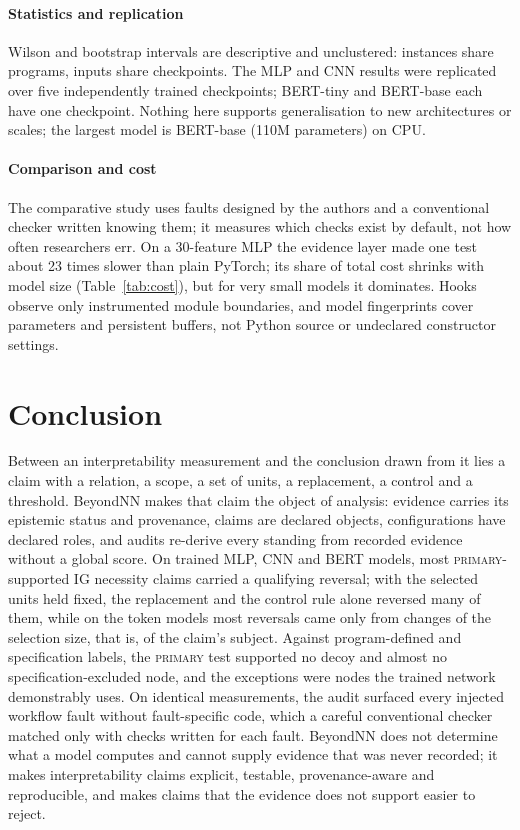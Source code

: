 \paragraph*{Statistics and replication}
Wilson and bootstrap intervals are descriptive and unclustered: instances share programs, inputs share checkpoints. The MLP and CNN results were replicated over five independently trained checkpoints; BERT-tiny and BERT-base each have one checkpoint. Nothing here supports generalisation to new architectures or scales; the largest model is BERT-base (110M parameters) on CPU.

\paragraph*{Comparison and cost}
The comparative study uses faults designed by the authors and a conventional checker written knowing them; it measures which checks exist by default, not how often researchers err. On a 30-feature MLP the evidence layer made one test about 23 times slower than plain PyTorch; its share of total cost shrinks with model size (Table~\ref{tab:cost}), but for very small models it dominates. Hooks observe only instrumented module boundaries, and model fingerprints cover parameters and persistent buffers, not Python source or undeclared constructor settings.

\section{Conclusion}
\label{sec:conclusion}

Between an interpretability measurement and the conclusion drawn from it lies a claim with a relation, a scope, a set of units, a replacement, a control and a threshold. BeyondNN makes that claim the object of analysis: evidence carries its epistemic status and provenance, claims are declared objects, configurations have declared roles, and audits re-derive every standing from recorded evidence without a global score. On trained MLP, CNN and BERT models, most \textsc{primary}-supported IG necessity claims carried a qualifying reversal; with the selected units held fixed, the replacement and the control rule alone reversed many of them, while on the token models most reversals came only from changes of the selection size, that is, of the claim's subject. Against program-defined and specification labels, the \textsc{primary} test supported no decoy and almost no specification-excluded node, and the exceptions were nodes the trained network demonstrably uses. On identical measurements, the audit surfaced every injected workflow fault without fault-specific code, which a careful conventional checker matched only with checks written for each fault. BeyondNN does not determine what a model computes and cannot supply evidence that was never recorded; it makes interpretability claims explicit, testable, provenance-aware and reproducible, and makes claims that the evidence does not support easier to reject.

